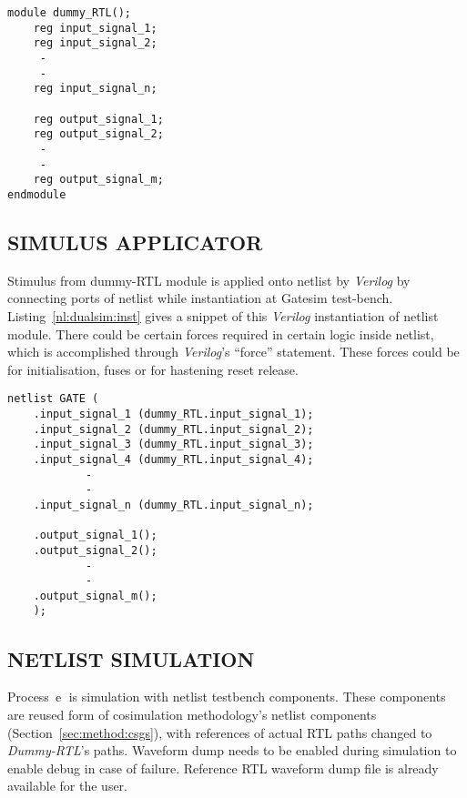 \lstset{language=Verilog,
basicstyle=\footnotesize,
frame=shadowbox,
breaklines=true}          
\begin{lstlisting}[frame=single, caption=Dummy RTL Module, label=nl:dualsim:dummy]  
module dummy_RTL();
	reg input_signal_1;
	reg input_signal_2;
	 -
	 -
	reg input_signal_n;
					
	reg output_signal_1;
	reg output_signal_2;
	 -
	 -
	reg output_signal_m;
endmodule
\end{lstlisting}



\subsection{SIMULUS APPLICATOR}
Stimulus from dummy-RTL module is applied onto netlist by {\it Verilog} by connecting ports of netlist while instantiation at Gatesim test-bench.  Listing~\ref{nl:dualsim:inst} gives a snippet of this {\it Verilog} instantiation of netlist module. There could be certain forces required in certain logic inside netlist, which is accomplished through {\it Verilog}'s ``force'' statement. These forces could be for initialisation, fuses or for hastening reset release.

\lstset{language=Verilog,
basicstyle=\footnotesize,
frame=shadowbox,
breaklines=true}          
\begin{lstlisting}[frame=single, caption=Verilog Instantiation, label=nl:dualsim:inst]  
netlist GATE (
	.input_signal_1 (dummy_RTL.input_signal_1);
	.input_signal_2 (dummy_RTL.input_signal_2);
	.input_signal_3 (dummy_RTL.input_signal_3);
	.input_signal_4 (dummy_RTL.input_signal_4);
			-
			-
	.input_signal_n (dummy_RTL.input_signal_n);

	.output_signal_1();
	.output_signal_2();
			-
			-
	.output_signal_m();
	);

\end{lstlisting}



\subsection{NETLIST SIMULATION}
Process~\textcircled{e} is simulation with netlist testbench components. These components are reused form of cosimulation methodology's netlist components (Section~\ref{sec:method:csgs}), with references of actual RTL paths changed to {\it Dummy-RTL}'s paths. Waveform dump needs to be enabled during simulation to enable debug in case of failure. Reference RTL waveform dump file is already available for the user.


